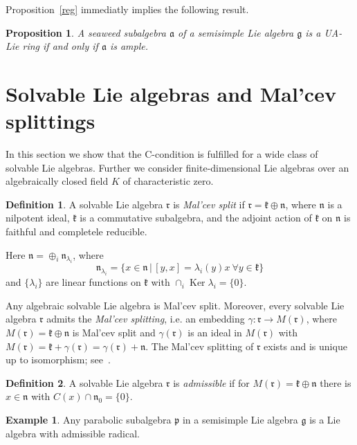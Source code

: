 \documentclass[a4paper,draft,reqno,12pt]{amsart}
\newtheorem{proposition}{Proposition}
\theoremstyle{definition}
\newtheorem{definition}{Definition}
\newtheorem{example}{Example}
\theoremstyle{remark}
\DeclareMathOperator{\Ker}{Ker}
\def\ggg{\mathfrak{g}}
\def\ppp{\mathfrak{p}}
\def\nnn{\mathfrak{n}}
\def\kkk{\mathfrak{k}}
\def\rrr{\mathfrak{r}}
\def\aaa{\mathfrak{a}}
\begin{document}
\smallskip 

Proposition~\ref{reg} immediatly implies the following result.

\begin{proposition}
\label{psw}
A seaweed subalgebra $\aaa$ of a semisimple Lie algebra $\ggg$ is a UA-Lie ring if and only if $\aaa$ is ample. 
\end{proposition}

\section{Solvable Lie algebras and Mal'cev splittings} 
\label{ms}

In this section we show that the C-condition is fulfilled for a wide class of solvable Lie algebras. Further we consider finite-dimensional Lie algebras over an algebraically closed field $K$ of characteristic zero. 

\begin{definition}
A solvable Lie algebra $\rrr$ is {\it Mal'cev split} if $\rrr=\kkk\oplus\nnn$, where $\mathfrak{n}$ is a nilpotent ideal, $\mathfrak{k}$ is a commutative subalgebra, and the adjoint action of $\kkk$ on $\nnn$ is faithful and completele reducible. 
\end{definition} 

Here $\nnn=\oplus_i\nnn_{\lambda_i}$, where 
$$
\nnn_{\lambda_i}=\{x\in\nnn \, | \, [y,x]=\lambda_i(y)x \ \forall y\in\kkk\}
$$
and $\{\lambda_i\}$ are linear functions on $\kkk$ with $\cap_i\Ker\lambda_i=\{0\}$. 

\bigskip

Any algebraic solvable Lie algebra is Mal'cev split. Moreover, every solvable Lie algebra $\rrr$ admits the {\it Mal'cev splitting}, i.e. an embedding $\gamma\colon\rrr\to M(\rrr)$, where $M(\rrr)=\kkk\oplus\nnn$ is Mal'cev split and $\gamma(\rrr)$ is an ideal in $M(\rrr)$ with $M(\rrr)=\kkk+\gamma(\rrr)=\gamma(\rrr)+\nnn$. The Mal'cev splitting of $\rrr$ exists and is unique up to isomorphism; see~\cite{Mal}. 

\begin{definition}
A solvable Lie algebra $\rrr$ is {\it admissible} if for $M(\rrr)=\kkk\oplus\nnn$ there is $x\in\nnn$ with $C(x)\cap\nnn_0=\{0\}$. 
\end{definition} 

\begin{example}
Any parabolic subalgebra $\ppp$ in a semisimple Lie algebra $\ggg$ is a Lie algebra with admissible radical. 
\end{example}
\end{document}
